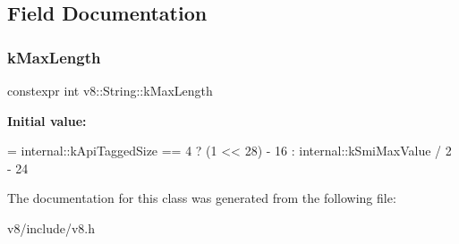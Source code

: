 \subsection{Field Documentation}
\mbox{\label{classv8_1_1String_a66259940a4836974906729017ff25fd2}} 
\subsubsection{\texorpdfstring{k\+Max\+Length}{kMaxLength}}
{\footnotesize\ttfamily constexpr int v8\+::\+String\+::k\+Max\+Length\hspace{0.3cm}{\ttfamily [static]}}

{\bfseries Initial value\+:}
\begin{DoxyCode}
= internal::kApiTaggedSize == 4
                                        ? (1 << 28) - 16
                                        : internal::kSmiMaxValue / 2 - 24
\end{DoxyCode}


The documentation for this class was generated from the following file\+:\begin{DoxyCompactItemize}
\item 
v8/include/v8.\+h\end{DoxyCompactItemize}
